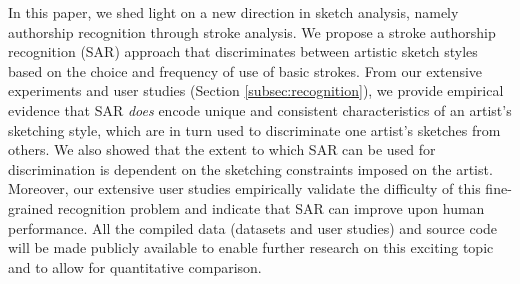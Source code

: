 In this paper, we shed light on a new direction in sketch analysis, namely authorship recognition through stroke analysis. We propose a stroke authorship recognition (SAR) approach that discriminates between artistic sketch styles based on the choice and frequency of use of basic strokes. From our extensive experiments and user studies (Section \ref{subsec:recognition}), we provide empirical evidence that SAR \emph{does} encode unique and consistent characteristics of an artist's sketching style, which are in turn used to discriminate one artist's sketches from others. We also showed that the extent to which SAR can be used for discrimination is dependent on the sketching constraints imposed on the artist. Moreover, our extensive user studies empirically validate the difficulty of this fine-grained recognition problem and indicate that SAR can improve upon human performance. All the compiled data (datasets and user studies) and source code will be made publicly available to enable further research on this exciting topic and to allow for quantitative comparison.








